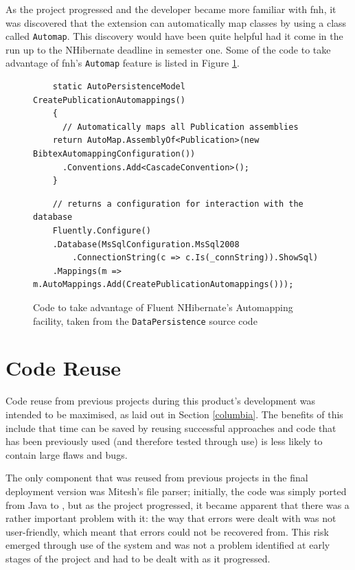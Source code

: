 As the project progressed and the developer became more familiar with \gls{fnh}, it was discovered that the extension can automatically map classes by using a class called \texttt{Automap}.  This discovery would have been quite helpful had it come in the run up to the NHibernate deadline in semester one.
Some of the code to take advantage of \gls{fnh}'s \texttt{Automap} feature is listed in Figure \ref{fig:fnhCode}.

\begin{figure}
	\begin{center}
			\lstset{language=CSharp} 
			\begin{lstlisting}
	static AutoPersistenceModel CreatePublicationAutomappings()
	{
	  // Automatically maps all Publication assemblies
    return AutoMap.AssemblyOf<Publication>(new BibtexAutomappingConfiguration())
      .Conventions.Add<CascadeConvention>();
	}
			\end{lstlisting}
			\lstset{language=CSharp} 
			\begin{lstlisting}
	// returns a configuration for interaction with the database
	Fluently.Configure()
    .Database(MsSqlConfiguration.MsSql2008
		.ConnectionString(c => c.Is(_connString)).ShowSql)
    .Mappings(m => m.AutoMappings.Add(CreatePublicationAutomappings()));
			\end{lstlisting}
		\caption{Code to take advantage of Fluent NHibernate's Automapping facility, taken from the \texttt{DataPersistence} source code}
		\label{fig:fnhCode}
	\end{center}
\end{figure}

\section{Code Reuse}
\label{codeReuse}
Code reuse from previous projects during this product's development was intended to be maximised, as laid out in Section \ref{columbia}.  The benefits of this include that time can be saved by reusing successful approaches and code that has been previously used (and therefore tested through use) is less likely to contain large flaws and bugs.

The only component that was reused from previous projects in the final deployment version was Mitesh's \bibtex{} file parser;  initially, the code was simply ported from Java to \cs, but as the project progressed, it became apparent that there was a rather important problem with it: the way that errors were dealt with was not user-friendly, which meant that errors could not be recovered from.  This risk emerged through use of the system and was not a problem identified at early stages of the project and had to be dealt with as it progressed.

